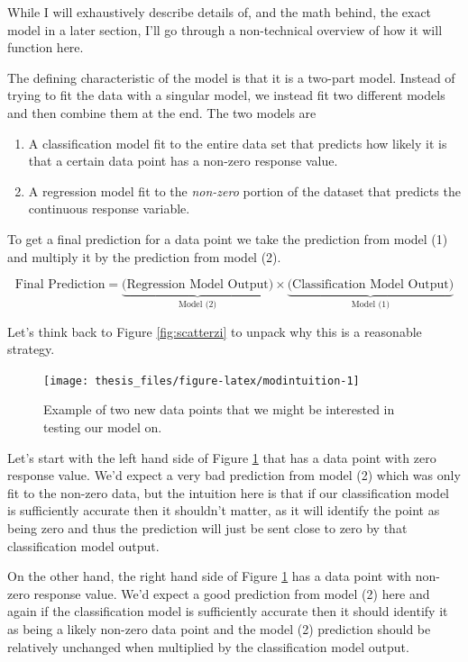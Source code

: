 \documentclass[12pt,twoside]{reedthesis}
\begin{document}
While I will exhaustively describe details of, and the math behind, the exact model in a later section, I'll go through a non-technical overview of how it will function here.

The defining characteristic of the model is that it is a two-part model. Instead of trying to fit the data with a singular model, we instead fit two different models and then combine them at the end. The two models are
\begin{enumerate}
\def\labelenumi{\arabic{enumi}.}
\item
  A classification model fit to the entire data set that predicts how likely it is that a certain data point has a non-zero response value.
\item
  A regression model fit to the \emph{non-zero} portion of the dataset that predicts the continuous response variable.
\end{enumerate}
To get a final prediction for a data point we take the prediction from model (1) and multiply it by the prediction from model (2).

\[
\text{Final Prediction} = \underbrace{\bigg(\text{Regression Model Output}\bigg)}_{\text{Model (2)}} \times \underbrace{\bigg(\text{Classification Model Output}\bigg)}_{\text{Model (1)}}
\]

Let's think back to Figure \ref{fig:scatterzi} to unpack why this is a reasonable strategy.
\begin{figure}

{\centering \texttt{[image: thesis\_files/figure-latex/modintuition-1]} 

}

\caption{Example of two new data points that we might be interested in testing our model on.}\label{fig:modintuition}
\end{figure}
Let's start with the left hand side of Figure \ref{fig:modintuition} that has a data point with zero response value. We'd expect a very bad prediction from model (2) which was only fit to the non-zero data, but the intuition here is that if our classification model is sufficiently accurate then it shouldn't matter, as it will identify the point as being zero and thus the prediction will just be sent close to zero by that classification model output.

On the other hand, the right hand side of Figure \ref{fig:modintuition} has a data point with non-zero response value. We'd expect a good prediction from model (2) here and again if the classification model is sufficiently accurate then it should identify it as being a likely non-zero data point and the model (2) prediction should be relatively unchanged when multiplied by the classification model output.
\end{document}
